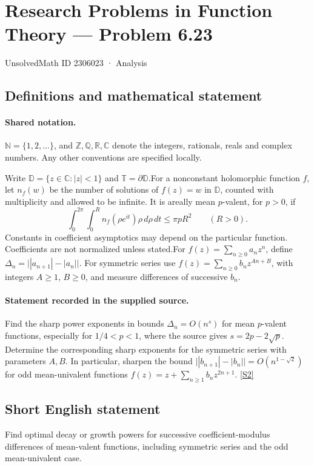\documentclass[11pt]{article}
\newcommand{\sref}[2]{\hyperlink{source:#1:#2}{[S#2]}}
\begin{document}
\setcounter{section}{2306022}
\section{Research Problems in Function Theory — Problem 6.23}\label{2306023}
{\small\sffamily UnsolvedMath ID 2306023 · Analysis}
\subsection{Definitions and mathematical statement}

\paragraph{Shared notation.}$\mathbb N=\{1,2,\ldots\}$, and $\mathbb Z,\mathbb Q,\mathbb R,\mathbb C$ denote the integers, rationals, reals and complex numbers. Any other conventions are specified locally.


Write $\mathbb D=\{z\in\mathbb C:|z|<1\}$ and $\mathbb T=\partial\mathbb D$.For a nonconstant holomorphic function $f$, let $n_f(w)$ be the number of solutions of $f(z)=w$ in $\mathbb D$, counted with multiplicity and allowed to be infinite. It is areally mean $p$-valent, for $p>0$, if
\[\int_0^{2\pi}\int_0^R n_f(\rho e^{it})\rho\,d\rho\,dt\le\pi pR^2\qquad(R>0).\]
Constants in coefficient asymptotics may depend on the particular function. Coefficients are not normalized unless stated.For $f(z)=\sum_{n\ge0}a_nz^n$, define $\Delta_n=\big||a_{n+1}|-|a_n|\big|$. For symmetric series use $f(z)=\sum_{n\ge0}b_nz^{An+B}$, with integers $A\ge1$, $B\ge0$, and measure differences of successive $b_n$.
\paragraph{Statement recorded in the supplied source.}
Find the sharp power exponents in bounds $\Delta_n=O(n^s)$ for mean $p$-valent functions, especially for $1/4<p<1$, where the source gives $s=2p-2\sqrt p$. Determine the corresponding sharp exponents for the symmetric series with parameters $A,B$. In particular, sharpen the bound $\big||b_{n+1}|-|b_n|\big|=O(n^{1-\sqrt2})$ for odd mean-univalent functions $f(z)=z+\sum_{n\ge1}b_nz^{2n+1}$. \sref{2306023}{2}
\subsection{Short English statement}
Find optimal decay or growth powers for successive coefficient-modulus differences of mean-valent functions, including symmetric series and the odd mean-univalent case.
\end{document}
